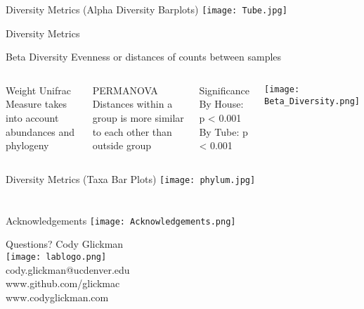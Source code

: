 \documentclass[11pt]{beamer}
\begin{document}
	\begin{frame}{Diversity Metrics (Alpha Diversity Barplots)}
	\centering
	\texttt{[image: Tube.jpg]}
	\end{frame}
	\begin{frame}{Diversity Metrics}
	\begin{block}{Beta Diversity}
	Evenness or distances of counts between samples
	\end{block}
	\begin{columns}
	\hspace{2cm}
	\begin{block}{Weight Unifrac}
  Measure takes into account abundances and phylogeny 
  \end{block}
  
  \begin{block}{PERMANOVA}
  Distances within a group is more similar to each other than outside group
  \end{block}
  
  \begin{block}{Significance}
	By House: p < 0.001
	\\
	By Tube: p < 0.001
	\end{block}
	
	\centering
	\texttt{[image: Beta\_Diversity.png]}
	\end{columns}
	
	

	\end{frame}
	
	\begin{frame}{Diversity Metrics (Taxa Bar Plots)}
	\centering
	\texttt{[image: phylum.jpg]}
	
	\end{frame}
	
	

\section{}

	
	\begin{frame}{Acknowledgements}
	\centering
	{\texttt{[image: Acknowledgements.png]} }
	\end{frame}
	
	\begin{frame}{Questions?}
	\center
	Cody Glickman \\ \texttt{[image: lablogo.png]} \\ cody.glickman@ucdenver.edu \\ \alert{www.github.com/glickmac} \\ www.codyglickman.com
	\end{frame}
\end{document}
